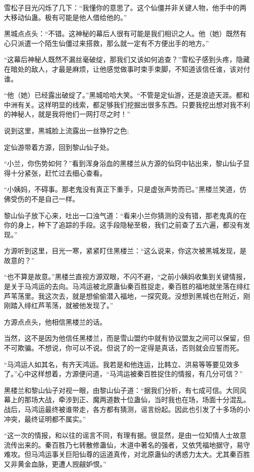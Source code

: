\begin{this_body}
雪松子目光闪烁了几下：“我懂你的意思了。这个仙僵并非关键人物，他手中的两大移动仙蛊。极有可能是他人借给他的。”

黑城点点头：“不错。这神秘的幕后人很有可能是我们相识之人。他（她）既然有心只派遣一个陌生仙僵过来搭救，那么就一定有不方便出手的地方。”

“这幕后神秘人既然不漏丝毫破绽，那我们又该如何追查？”雪松子感到头疼，隐藏在暗处的敌人，才最是麻烦，让他感觉做事时束手束脚，不知道该信任谁，该对付谁。

“他（她）已经露出破绽了。”黑城哈哈大笑。“不管是定仙游，还是浪迹天涯。都和中洲有关。这样明显的线索，都足够我们挖掘出很多东西。只要我挖出想对我不利的神秘人，就是我将他们一网打尽之时！”

说到这里，黑城脸上流露出一丝狰狞之色;

定仙游带着方源，回到黎山仙子处。

“小兰，你伤势如何？”看到浑身浴血的黑楼兰从方源的仙窍中钻出来，黎山仙子显得十分紧张，赶忙过去细心查看。

“小姨妈，不碍事。那老鬼没有真正下重手，只是虚张声势而已。”黑楼兰笑道，仿佛受伤的不是自己一样。

黎山仙子放下心来，吐出一口浊气道：“看来小兰你猜测的没有错，那老鬼真的在你的身上，种下了追踪的手段。这手段隐秘至极，我们之前查了五六遍，都没有发现。”

方源听到这里，目光一寒，紧紧盯住黑楼兰：“这么说来，你这次被黑城发现，是故意的？”

“也不算是故意。”黑楼兰直视方源双眼，不闪不避，“之前小姨妈收集到关键情报，是关于马鸿运的去向。马鸿运被北原蛊仙秦百胜捉走，秦百胜的福地就坐落在绯红芦苇荡里。我这次去，就是想偷偷潜入福地，一探究竟。没想到黑城也在附近，刚刚踏入绯红芦苇荡，就被他发现了。”

方源点点头，他相信黑楼兰的话。

当然，这不是因为他信任黑楼兰，而是雪山盟约中就有协议盟友之间可以保留，但不可欺骗。不想说，你可以不说。但说了的一定得是真话，否则就会应誓而死。

“马鸿运人如其名，有齐天鸿运。我若是和他连运，比韩立、洪易等等要见效多了。”心中这样想着，方源便问道，“马鸿运被秦百胜捉住的情报，有几分可信？”

黑楼兰和黎山仙子对视一眼，由黎山仙子道：“据我们分析，有七成可信。大同风幕上的那场大战，牵涉到正、魔两道数十位蛊仙，当时我也在场，场面十分混乱。战后，马鸿运最终被谁带走，各方都有猜测，谣言纷起。因此也引发了十多场的小冲突，最终证明都不属实。”

“这一次的情报，和以往的谣言不同，有理有据。很显然，是由一位知情人士故意流传出来的。秦百胜乃七转散修蛊仙，木道中著名的强者，又依凭福地据守，易守难攻。但马鸿运事关巨阳仙尊的运道真传，对北原蛊仙的诱惑力太大。尤其秦百胜又非黄金血脉，更遭人觊觎妒恨。”


\end{this_body}
